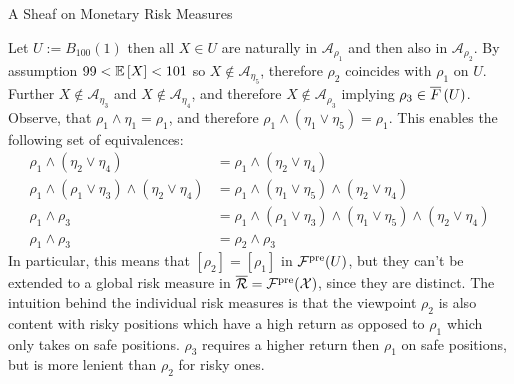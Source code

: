 \begin{subsection}{A Sheaf on Monetary Risk Measures}
\begin{example}
        Let \( U := B_{100}(1) \) then all \( X \in U \) are naturally in \( \mathcal{A}_{\rho_1} \) 
        and then also in \( \mathcal{A}_{\rho_2} \). By assumption \( 99 < \mathbb{E} \left [X \right] < 101  \)
        so \( X \notin \mathcal{A}_{\eta_5} \), therefore \( \rho_2 \) coincides with \( \rho_1 \) on \( U \).
        Further \( X \notin \mathcal{A}_{\eta_3} \) and \( X \notin \mathcal{A}_{\eta_4} \), and therefore \( X \notin \mathcal{A}_{\rho_3} \)
        implying \( \rho_3 \in \overline{F}\left (U \right) \).
        Observe, that \( \rho_1 \wedge \eta_1 = \rho_1 \), and therefore \( \rho_1 \wedge (\eta_1 \vee \eta_5) = \rho_1 \).
        This enables the following set of equivalences:
        \begin{align*}
            \rho_1 \wedge (\eta_2 \vee \eta_4) &= \rho_1 \wedge (\eta_2 \vee \eta_4) \\
            \rho_1 \wedge (\rho_1 \vee \eta_3) \wedge (\eta_2 \vee \eta_4) &= \rho_1 \wedge (\eta_1 \vee \eta_5) \wedge (\eta_2 \vee \eta_4) \\
            \rho_1 \wedge \rho_3 &= \rho_1 \wedge (\rho_1 \vee \eta_3) \wedge (\eta_1 \vee \eta_5) \wedge (\eta_2 \vee \eta_4) \\
            \rho_1 \wedge \rho_3 &= \rho_2 \wedge \rho_3
        \end{align*}
        In particular, this means that \( [\rho_2] = [\rho_1] \) in \( \mathcal{F}^{\text{pre}}(U) \), but they can't be extended to a global risk measure
        in \( \overline{\mathcal{R}} = \mathcal{F}^{\text{pre}}(\mathcal{X}) \), since they are distinct.
        The intuition behind the individual risk measures is that the viewpoint \( \rho_2 \) is also content with risky positions which have a high return 
        as opposed to \( \rho_1 \) which only takes on safe positions. \( \rho_3 \) requires a higher return then \( \rho_1 \) on safe positions, but is more lenient
        than \( \rho_2 \) for risky ones.
    \end{example}


\end{subsection}
